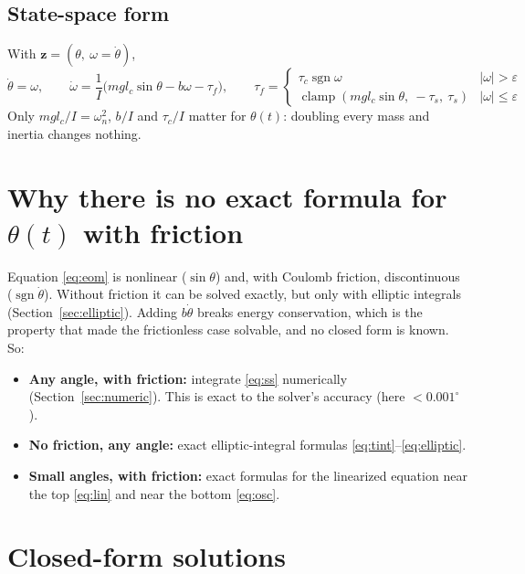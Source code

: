 \documentclass[10pt]{article}
\newcommand{\sgn}{\operatorname{sgn}}
\begin{document}
\subsection{State-space form}
With $\bm z=(\theta,\ \omega=\dot\theta)$,
\begin{equation}
\dot\theta=\omega,\qquad \dot\omega=\frac{1}{I}\Big(mgl_c\sin\theta-b\omega-\tau_f\Big),\qquad
\tau_f=\begin{cases}\tau_c\sgn\omega & |\omega|>\varepsilon\\ \operatorname{clamp}(mgl_c\sin\theta,\ -\tau_s,\ \tau_s) & |\omega|\le\varepsilon\end{cases}
\label{eq:ss}
\end{equation}
Only $mgl_c/I=\omega_n^2$, $b/I$ and $\tau_c/I$ matter for $\theta(t)$: doubling every mass and inertia changes nothing.

\section{Why there is no exact formula for $\theta(t)$ with friction}
Equation \eqref{eq:eom} is nonlinear ($\sin\theta$) and, with Coulomb friction, discontinuous ($\sgn\dot\theta$). Without friction it can be solved exactly, but only with elliptic integrals (Section~\ref{sec:elliptic}). Adding $b\dot\theta$ breaks energy conservation, which is the property that made the frictionless case solvable, and no closed form is known. So:
\begin{itemize}
\item \textbf{Any angle, with friction:} integrate \eqref{eq:ss} numerically (Section~\ref{sec:numeric}). This is exact to the solver's accuracy (here $<0.001^\circ$).
\item \textbf{No friction, any angle:} exact elliptic-integral formulas \eqref{eq:tint}--\eqref{eq:elliptic}.
\item \textbf{Small angles, with friction:} exact formulas for the linearized equation near the top \eqref{eq:lin} and near the bottom \eqref{eq:osc}.
\end{itemize}

\section{Closed-form solutions}
\end{document}
